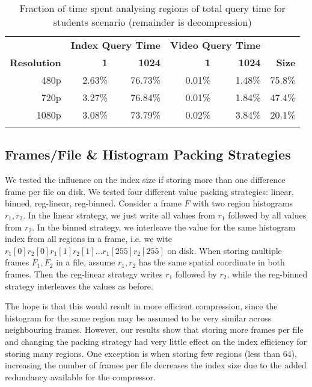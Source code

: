 \begin{table}[t]
    \caption{Fraction of time spent analysing regions of total query time for students scenario (remainder is decompression)}\label{res:time-components}	
	\centering
    \begin{tabular}{r rr rr r}
        ~ & \multicolumn{2}{c|}{\textbf{Index Query Time}} & \multicolumn{2}{c}{\textbf{Video Query Time}} \\
		\cline{2-5}
	    \textbf{Resolution} & \textbf{1} & \textbf{1024} & \textbf{1} & \textbf{1024} & \textbf{Size} \\ \hline\noalign{\smallskip}
	    480p            & 2.63\%  & 76.73\% & 0.01\%  & 1.48\%    & 75.8\%              \\
	    720p            & 3.27\%  & 76.84\% & 0.01\%  & 1.84\%    & 47.4\%              \\
	    1080p           & 3.08\%  & 73.79\% & 0.02\%  & 3.84\%    & 20.1\%              \\\noalign{\smallskip} 
        \hline\noalign{\smallskip}
	   \end{tabular}
\end{table}

\subsection*{Frames/File \& Histogram Packing Strategies}
We tested the influence on the index size if storing more than one difference frame per file on disk. We tested four different value packing strategies: linear, binned, reg-linear, reg-binned. Consider a frame $F$ with two region histograms $r_1, r_2$. In the linear strategy, we just write all values from $r_1$ followed by all values from $r_2$. In the binned strategy, we interleave the value for the same histogram index from all regions in a frame, i.e. we wite $r_1[0] r_2[0] r_1[1] r_2[1] \ldots r_1[255] r_2[255]$ on disk. 
When storing multiple frames $F_1, F_2$ in a file, assume $r_1, r_2$ has the same spatial coordinate in both frames. Then the reg-linear strategy writes $r_1$ followed by $r_2$, while the reg-binned strategy interleaves the values as before. 

The hope is that this would result in more efficient compression, since the histogram for the same region may be assumed to be very similar across neighbouring frames. However, our results show that 
storing more frames per file and changing the packing strategy had very little effect on the index efficiency for storing many regions. One exception is when storing few regions (less than 64), increasing the number of frames per file decreases the index size due to the added redundancy available for the compressor.

